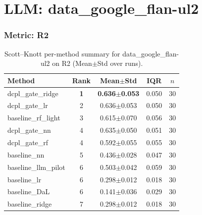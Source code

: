 \section*{LLM: data\_google\_flan-ul2}

\subsubsection*{Metric: R2}
\begin{table}[H]
\centering
\scriptsize
\setlength{\tabcolsep}{4pt}
\renewcommand{\arraystretch}{1.1}
\caption{Scott--Knott per-method summary for data\_google\_flan-ul2 on R2 (Mean$\pm$Std over runs).}
\label{tab:sk_data_google_flan-ul2_R2}
\begin{tabular}{l|c|c|c|c}
\hline
\textbf{Method} & \textbf{Rank} & \textbf{Mean$\pm$Std} & \textbf{IQR} & \textbf{$n$} \\
\hline
\rowcolor{red!15} dcpl\_gate\_ridge & \textbf{1} & \textbf{0.636$\pm$0.053} & 0.050 & 30 \\
dcpl\_gate\_lr & 2 & 0.636$\pm$0.053 & 0.050 & 30 \\
baseline\_rf\_light & 3 & 0.615$\pm$0.070 & 0.056 & 30 \\
dcpl\_gate\_nn & 4 & 0.635$\pm$0.050 & 0.051 & 30 \\
dcpl\_gate\_rf & 4 & 0.592$\pm$0.055 & 0.055 & 30 \\
baseline\_nn & 5 & 0.436$\pm$0.028 & 0.047 & 30 \\
baseline\_llm\_pilot & 6 & 0.503$\pm$0.042 & 0.059 & 30 \\
baseline\_lr & 6 & 0.298$\pm$0.012 & 0.018 & 30 \\
baseline\_DaL & 6 & 0.141$\pm$0.036 & 0.029 & 30 \\
baseline\_ridge & 7 & 0.298$\pm$0.012 & 0.018 & 30 \\
\hline
\end{tabular}
\end{table}

